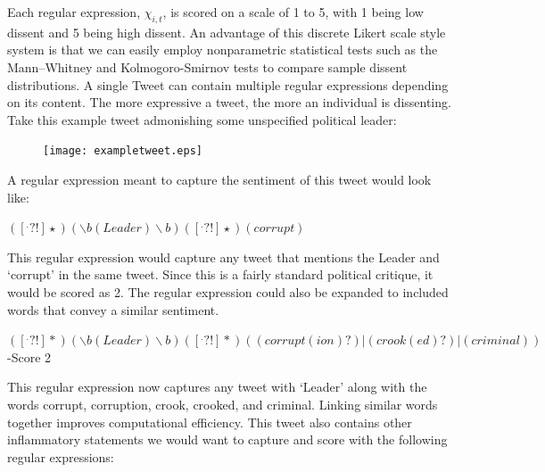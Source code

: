 \documentclass[12pt]{article}
\begin{document}
\begin{spacing}{1.5}
Each regular expression, $\chi_{i,t}$, is scored on a scale of 1 to 5, with 1 being low dissent and 5 being high dissent. An advantage of this discrete Likert scale style system is that we can easily employ nonparametric statistical tests such as the Mann–Whitney and Kolmogoro-Smirnov tests to compare sample dissent distributions. A single Tweet can contain multiple regular expressions depending on its content. The more expressive a tweet, the more an individual is dissenting. Take this example tweet admonishing some unspecified political leader: 





\vspace{.5 em}

\begin{figure}[htb]
\centering 
\texttt{[image: exampletweet.eps]} 
\end{figure}
     
\noindent A regular expression meant to capture the sentiment of this tweet would look like:

\begin{center}
$([^.?!]\star)(\backslash b(Leader)\backslash b)([^.?!]\star)(corrupt)$
\end{center}

\noindent This regular expression would capture any tweet that mentions the Leader and `corrupt' in the same tweet. Since this is a fairly standard political critique, it would be scored as 2. The regular expression could also be expanded to included words that convey a similar sentiment.

\begin{center}
$([^.?!]*) (\backslash b(Leader)\backslash b)([^.?!]*)((corrupt(ion)?)|(crook(ed)?)|(criminal))$ -Score 2
\end{center}

\noindent This regular expression now captures any tweet with `Leader' along with the words corrupt, corruption, crook, crooked, and criminal. Linking similar words together improves computational efficiency. This tweet also contains other inflammatory statements we would want to capture and score with the following regular expressions:  

\vspace{.5 em}


\end{spacing}
\end{document}
